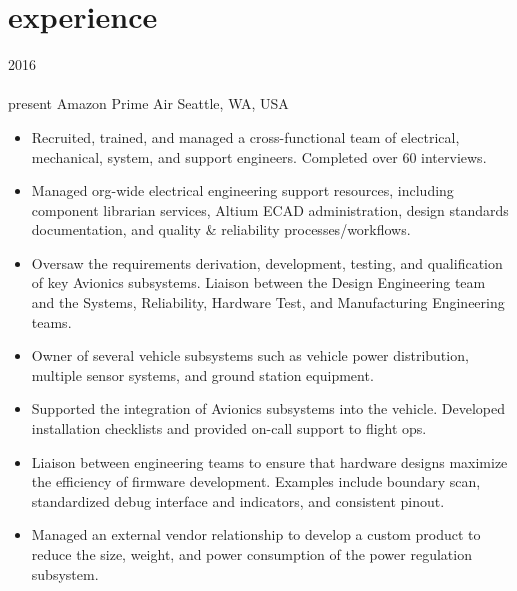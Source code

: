 
\section{experience}

\begin{entrylist}
\entry
  {2016\\\faChevronDown\\{present}}
  {Amazon Prime Air}
  {Seattle, WA, USA}
  {
\begin{itemize}[leftmargin=12pt]
  \item Recruited, trained, and managed a cross-functional team of electrical, mechanical, system, and support engineers. Completed over 60 interviews.
  \item Managed org-wide electrical engineering support resources, including component librarian services, Altium ECAD administration, design standards documentation, and quality \& reliability processes/workflows.
  \item Oversaw the requirements derivation, development, testing, and qualification of key Avionics subsystems. Liaison between the Design Engineering team and the Systems, Reliability, Hardware Test, and Manufacturing Engineering teams.
\end{itemize}
\begin{itemize}[leftmargin=12pt]
  \item Owner of several vehicle subsystems such as vehicle power distribution, multiple sensor systems, and ground station equipment.
  \item Supported the integration of Avionics subsystems into the vehicle. Developed installation checklists and provided on-call support to flight ops.
  \item Liaison between engineering teams to ensure that hardware designs maximize the efficiency of firmware development. Examples include boundary scan, standardized debug interface and indicators, and consistent pinout.
  \item Managed an external vendor relationship to develop a custom product to reduce the size, weight, and power consumption of the power regulation subsystem.

\end{itemize}}
\end{entrylist}
